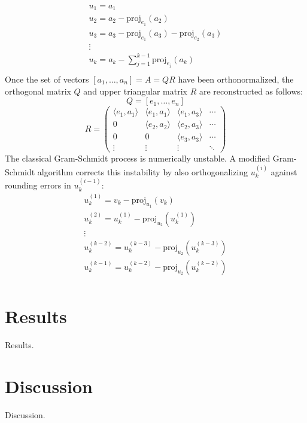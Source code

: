 \documentclass{article}
\begin{document}
$$\begin{array}{l}
u_1=a_1\\
u_2=a_2-\mathrm{proj}_{e_1}(a_2)\\
u_3=a_3-\mathrm{proj}_{e_1}(a_3)-\mathrm{proj}_{e_2}(a_3)\\
\vdots\\
u_k=a_k-\sum_{j=1}^{k-1}\mathrm{proj}_{e_j}(a_k)\\
\end{array}$$
Once the set of vectors $[a_1,\ldots,a_n]=A=QR$ have been orthonormalized, the orthogonal matrix $Q$ and upper triangular matrix $R$ are reconstructed as follows:
$$Q=[e_1,\ldots,e_n]$$
$$R=\left(\begin{array}{cccc}
\langle e_1,a_1 \rangle & \langle e_1,a_1 \rangle & \langle e_1,a_3 \rangle & \cdots \\
0 & \langle e_2,a_2 \rangle & \langle e_2,a_3 \rangle & \cdots \\
0 & 0 & \langle e_3,a_3 \rangle & \cdots \\
\vdots & \vdots & \vdots & \ddots
\end{array}\right)$$
The classical Gram-Schmidt process is numerically unstable. A modified Gram-Schmidt algorithm corrects this instability by also orthogonalizing $u_k^{(i)}$ against rounding errors in $u_k^{(i-1)}$:
$$\begin{array}{l}
u_k^{(1)}=v_k-\mathrm{proj}_{u_1}(v_k)\\
u_k^{(2)}=u_k^{(1)}-\mathrm{proj}_{u_2}(u_k^{(1)})\\
\vdots\\
u_k^{(k-2)}=u_k^{(k-3)}-\mathrm{proj}_{u_2}(u_k^{(k-3)})\\
u_k^{(k-1)}=u_k^{(k-2)}-\mathrm{proj}_{u_2}(u_k^{(k-2)})\\
\end{array}$$

\section*{Results}

Results.

\section*{Discussion}

Discussion.
\end{document}
